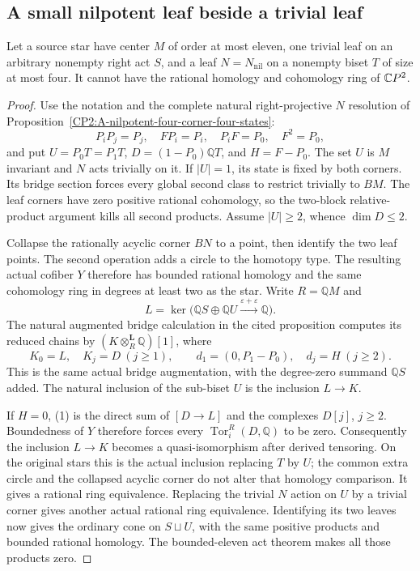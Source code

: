 \subsection{A small nilpotent leaf beside a trivial leaf}

\begin{proposition}
\label{CP2:A-star-nilpotent-four-leaf-eleven}
Let a source star have center $M$ of order at most eleven,
one trivial leaf on an arbitrary nonempty right act $S$,
and a leaf $N=N_{\mathrm{nil}}$ on a nonempty biset $T$ of
size at most four. It cannot have the rational homology
and cohomology ring of $\mathbb{C}P^2$.
\end{proposition}
\begin{proof}
Use the notation and the complete natural right-projective
$N$ resolution of
Proposition~\ref{CP2:A-nilpotent-four-corner-four-states}:
\[
 P_iP_j=P_j,\quad FP_i=P_i,\quad P_iF=P_0,
 \quad F^2=P_0,
\]
and put $U=P_0T=P_1T$, $D=(1-P_0)\mathbb QT$, and
$H=F-P_0$. The set $U$ is $M$ invariant and $N$ acts
trivially on it. If $|U|=1$, its state is fixed by both
corners. Its bridge section forces every global second
class to restrict trivially to $BM$. The leaf corners
have zero positive rational cohomology, so the two-block
relative-product argument kills all second products.
Assume $|U|\geq2$, whence $\dim D\leq2$.

Collapse the rationally acyclic corner $BN$ to a point,
then identify the two leaf points. The second operation
adds a circle to the homotopy type. The resulting actual
cofiber $Y$ therefore has bounded rational homology and
the same cohomology ring in degrees at least two as the
star. Write $R=\mathbb QM$ and
\[
 L=\ker\bigl(\mathbb QS\oplus\mathbb QU
                         \xrightarrow{\varepsilon+\varepsilon}\mathbb Q\bigr).
\]
The natural augmented bridge calculation in the cited
proposition computes its reduced chains by
$(K\otimes_R^{\mathbf L}\mathbb Q)[1]$, where
\[
 K_0=L,\quad K_j=D\ (j\geq1),\qquad
 d_1=(0,P_1-P_0),\quad d_j=H\ (j\geq2).                    \tag{1}
\]
This is the same actual bridge augmentation, with the
degree-zero summand $\mathbb QS$ added. The natural
inclusion of the sub-biset $U$ is the inclusion $L\to K$.

If $H=0$, (1) is the direct sum of $[D\to L]$ and the
complexes $D[j]$, $j\geq2$. Boundedness of $Y$ therefore
forces every $\operatorname{Tor}^R_i(D,\mathbb Q)$ to be
zero. Consequently the inclusion $L\to K$ becomes a
quasi-isomorphism after derived tensoring. On the original
stars this is the actual inclusion replacing $T$ by $U$;
the common extra circle and the collapsed acyclic corner
do not alter that homology comparison. It gives a rational
ring equivalence. Replacing the trivial $N$ action on $U$
by a trivial corner gives another actual rational ring
equivalence. Identifying its two leaves now gives the
ordinary cone on $S\sqcup U$, with the same positive
products and bounded rational homology. The bounded-eleven
act theorem makes all those products zero.


\end{proof}
